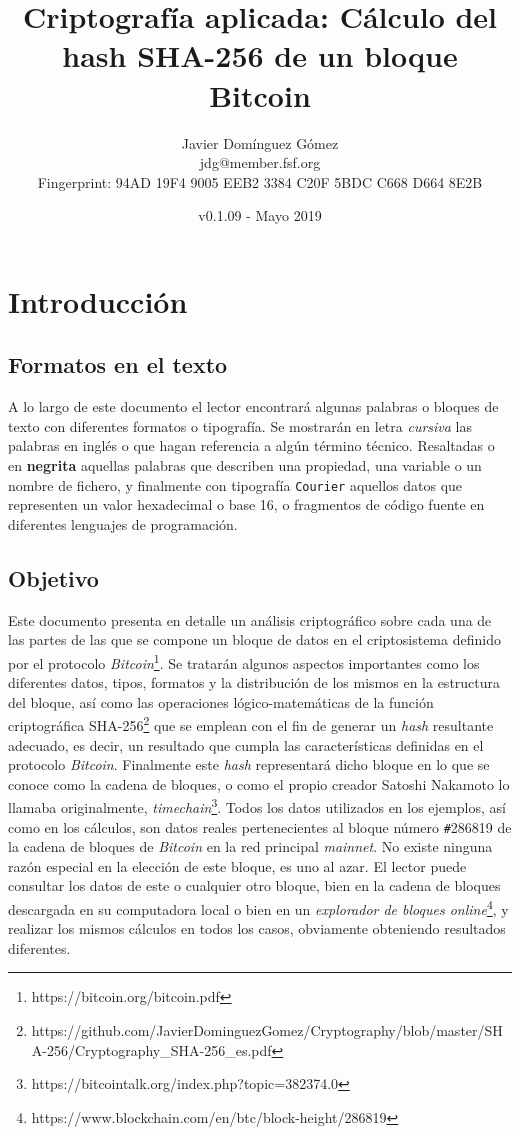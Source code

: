 \documentclass{article}
\title{\textbf{Criptografía aplicada: Cálculo del hash SHA-256 de un bloque Bitcoin}}
\author{Javier Domínguez Gómez \\
\small{jdg@member.fsf.org} \\
\small{Fingerprint: 94AD 19F4 9005 EEB2 3384 C20F 5BDC C668 D664 8E2B}}
\date{v0.1.09 - Mayo 2019}
\begin{document}
\maketitle

\tableofcontents{}

\vspace{19mm}

\section{Introducción}
    \subsection{Formatos en el texto}
    A lo largo de este documento el lector encontrará algunas palabras o bloques de texto con diferentes formatos o tipografía. Se mostrarán en letra \textit{cursiva} las palabras en inglés o que hagan referencia a algún término técnico. Resaltadas o en \textbf{negrita} aquellas palabras que describen una propiedad, una variable o un nombre de fichero, y finalmente con tipografía \texttt{Courier} aquellos datos que representen un valor hexadecimal o base 16, o fragmentos de código fuente en diferentes lenguajes de programación.
    
    \subsection{Objetivo}
    Este documento presenta en detalle un análisis criptográfico sobre cada una de las partes de las que se compone un bloque de datos en el criptosistema definido por el protocolo \textit{Bitcoin}\footnote{https://bitcoin.org/bitcoin.pdf}. Se tratarán algunos aspectos importantes como los diferentes datos, tipos, formatos y la distribución de los mismos en la estructura del bloque, así como las operaciones lógico-matemáticas de la función criptográfica SHA-256\footnote{https://github.com/JavierDominguezGomez/Cryptography/blob/master/SHA-256/Cryptography\_SHA-256\_es.pdf} que se emplean con el fin de generar un \textit{hash} resultante adecuado, es decir, un resultado que cumpla las características definidas en el protocolo \textit{Bitcoin}. Finalmente este \textit{hash} representará dicho bloque en lo que se conoce como la cadena de bloques, o como el propio creador Satoshi Nakamoto lo llamaba originalmente, \textit{timechain}\footnote{https://bitcointalk.org/index.php?topic=382374.0}. Todos los datos utilizados en los ejemplos, así como en los cálculos, son datos reales pertenecientes al bloque número \texttt{\#}286819 de la cadena de bloques de \textit{Bitcoin} en la red principal \textit{mainnet}. No existe ninguna razón especial en la elección de este bloque, es uno al azar. El lector puede consultar los datos de este o cualquier otro bloque, bien en la cadena de bloques descargada en su computadora local o bien en un \textit{explorador de bloques online}\footnote{https://www.blockchain.com/en/btc/block-height/286819}, y realizar los mismos cálculos en todos los casos, obviamente obteniendo resultados diferentes.
    
\end{document}
